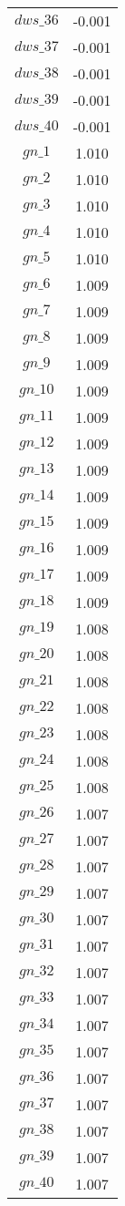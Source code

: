 \begin{center}
\begin{longtable}{cc}
$dws\_36$ 	 & 	 -0.001 \\
$dws\_37$ 	 & 	 -0.001 \\
$dws\_38$ 	 & 	 -0.001 \\
$dws\_39$ 	 & 	 -0.001 \\
$dws\_40$ 	 & 	 -0.001 \\
$gn\_1$ 	 & 	 1.010 \\
$gn\_2$ 	 & 	 1.010 \\
$gn\_3$ 	 & 	 1.010 \\
$gn\_4$ 	 & 	 1.010 \\
$gn\_5$ 	 & 	 1.010 \\
$gn\_6$ 	 & 	 1.009 \\
$gn\_7$ 	 & 	 1.009 \\
$gn\_8$ 	 & 	 1.009 \\
$gn\_9$ 	 & 	 1.009 \\
$gn\_10$ 	 & 	 1.009 \\
$gn\_11$ 	 & 	 1.009 \\
$gn\_12$ 	 & 	 1.009 \\
$gn\_13$ 	 & 	 1.009 \\
$gn\_14$ 	 & 	 1.009 \\
$gn\_15$ 	 & 	 1.009 \\
$gn\_16$ 	 & 	 1.009 \\
$gn\_17$ 	 & 	 1.009 \\
$gn\_18$ 	 & 	 1.009 \\
$gn\_19$ 	 & 	 1.008 \\
$gn\_20$ 	 & 	 1.008 \\
$gn\_21$ 	 & 	 1.008 \\
$gn\_22$ 	 & 	 1.008 \\
$gn\_23$ 	 & 	 1.008 \\
$gn\_24$ 	 & 	 1.008 \\
$gn\_25$ 	 & 	 1.008 \\
$gn\_26$ 	 & 	 1.007 \\
$gn\_27$ 	 & 	 1.007 \\
$gn\_28$ 	 & 	 1.007 \\
$gn\_29$ 	 & 	 1.007 \\
$gn\_30$ 	 & 	 1.007 \\
$gn\_31$ 	 & 	 1.007 \\
$gn\_32$ 	 & 	 1.007 \\
$gn\_33$ 	 & 	 1.007 \\
$gn\_34$ 	 & 	 1.007 \\
$gn\_35$ 	 & 	 1.007 \\
$gn\_36$ 	 & 	 1.007 \\
$gn\_37$ 	 & 	 1.007 \\
$gn\_38$ 	 & 	 1.007 \\
$gn\_39$ 	 & 	 1.007 \\
$gn\_40$ 	 & 	 1.007 \\
\bottomrule%
\end{longtable}
\end{center}
